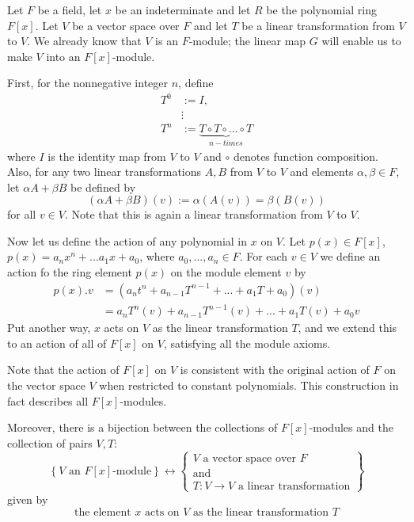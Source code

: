 \begin{eg}[(F{[x]}-modules)]
    Let $F$ be a field, let $x$ be an indeterminate and let $R$ be the polynomial ring $F[x]$. Let $V$ be a vector space over $F$ and let $T$ be a linear transformation from $V$ to $V$. We already know that $V$ is an $F$-module; the linear map $G$ will enable us to make $V$ into an $F[x]$-module.

    First, for the nonnegative integer $n$, define \begin{align*}
        T^0 &:= I, \\
        &\vdots \\
        T^n &:= \underbrace{T\circ T\circ ...\circ T}_{n-times}
    \end{align*}
    where $I$ is the identity map from $V$ to $V$ and $\circ$ denotes function composition. Also, for any two linear transformations $A, B$ from $V$ to $V$ and elements $\alpha,\beta \in F$, let $\alpha A+\beta B$ be defined by \begin{equation*}
        (\alpha A + \beta B)(v) := \alpha(A(v)) = \beta(B(v))
    \end{equation*}
    for all $v \in V$. Note that this is again a linear transformation from $V$ to $V$.


    Now let us define the action of any polynomial in $x$ on $V$. Let $p(x) \in F[x]$, $p(x) = a_nx^n+...a_1x+a_0$, where $a_0,...,a_n \in F$. For each $v \in V$ we define an action fo the ring element $p(x)$ on the module element $v$ by \begin{align*}
        p(x).v &= (a_nt^n+a_{n-1}T^{n-1}+...+a_1T+a_0)(v) \\
        &= a_nT^n(v) + a_{n-1}T^{n-1}(v) + ... + a_1T(v) + a_0v
    \end{align*}
    Put another way, $x$ acts on $V$ as the linear transformation $T$, and we extend this to an action of all of $F[x]$ on $V$, satisfying all the module axioms.

    Note that the action of $F[x]$ on $V$ is consistent with the original action of $F$ on the vector space $V$ when restricted to constant polynomials. This construction in fact describes all $F[x]$-modules.

    Moreover, there is a bijection between the collections of $F[x]$-modules and the collection of pairs $V,T$: \begin{equation*}
        \left\{V\text{ an }F[x]\text{-module}\right\} \leftrightarrow \left\{\begin{array}{c} V\text{ a vector space over } F \\ \text{and} \\ T:V\rightarrow V\text{ a linear transformation}\end{array}\right\}
    \end{equation*}
    given by \begin{equation*}
        \text{the element $x$ acts on $V$ as the linear transformation $T$}
    \end{equation*}


\end{eg}
